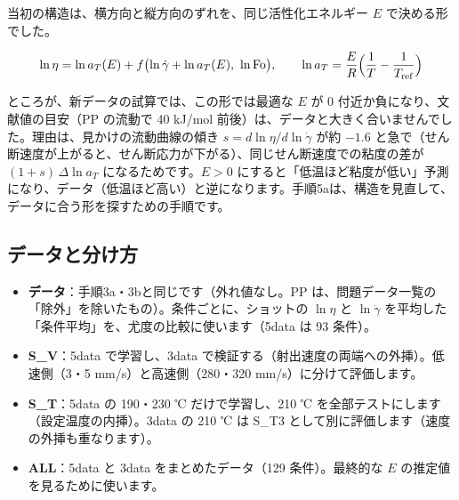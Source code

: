 \documentclass[paper=a4paper,fontsize=10.5pt,line_length=44zw,number_of_lines=38]{jlreq}
\newcommand{\gd}{\dot{\gamma}}
\newenvironment{points}{\begin{itemize}[label=$\triangleright$,leftmargin=1.5\zw,itemsep=0.3ex,topsep=0.5ex,parsep=0pt]}{\end{itemize}}
\newcommand{\pt}[1]{\item \textbf{#1}：}
\begin{document}
当初の構造は、横方向と縦方向のずれを、同じ活性化エネルギー $E$ で決める形でした。

\begin{equation}
\ln\eta = \ln a_T(E) + f\bigl(\ln\gd + \ln a_T(E),\ \ln \mathrm{Fo}\bigr),\qquad \ln a_T = \frac{E}{R}\Bigl(\frac1T - \frac1{T_{\mathrm{ref}}}\Bigr)
\end{equation}

ところが、新データの試算では、この形では最適な $E$ が 0 付近か負になり、文献値の目安（PP の流動で 40 kJ/mol 前後）は、データと大きく合いませんでした。理由は、見かけの流動曲線の傾き $s = d\ln\eta/d\ln\gd$ が約 $-1.6$ と急で（せん断速度が上がると、せん断応力が下がる）、同じせん断速度での粘度の差が $(1+s)\,\Delta\ln a_T$ になるためです。$E>0$ にすると「低温ほど粘度が低い」予測になり、データ（低温ほど高い）と逆になります。手順5aは、構造を見直して、データに合う形を探すための手順です。

\subsection{データと分け方}
\begin{points}
\pt{データ}手順3a・3bと同じです（外れ値なし。PP は、問題データ一覧の「除外」を除いたもの）。条件ごとに、ショットの $\ln\eta$ と $\ln\gd$ を平均した「条件平均」を、尤度の比較に使います（5data は 93 条件）。
\pt{S\_V}5data で学習し、3data で検証する（射出速度の両端への外挿）。低速側（3・5 mm/s）と高速側（280・320 mm/s）に分けて評価します。
\pt{S\_T}5data の 190・230 ℃ だけで学習し、210 ℃ を全部テストにします（設定温度の内挿）。3data の 210 ℃ は S\_T3 として別に評価します（速度の外挿も重なります）。
\pt{ALL}5data と 3data をまとめたデータ（129 条件）。最終的な $E$ の推定値を見るために使います。
\end{points}
\end{document}
